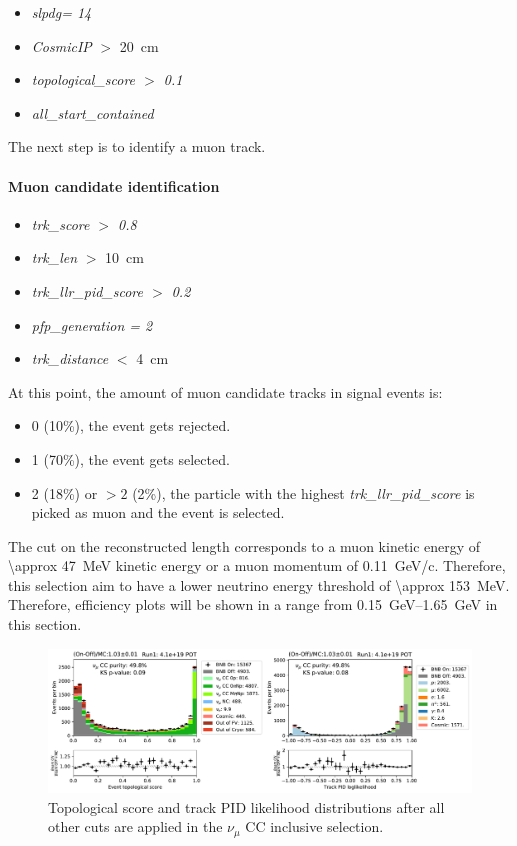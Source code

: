 \begin{itemize}
    \item \textit{slpdg= 14}
    \item \textit{CosmicIP} $>$ \SI{20}{\cm}
    \item \textit{topological\_score $>$ 0.1}
    \item \textit{all\_start\_contained}
\end{itemize} 

The next step is to identify a muon track.
\paragraph{Muon candidate identification} 
\begin{itemize}
    \item \textit{trk\_score $>$ 0.8}
    \item \textit{trk\_len} $>$ \SI{10}{\cm}
    \item \textit{trk\_llr\_pid\_score $>$ 0.2}
    \item \textit{pfp\_generation = 2}
    \item \textit{trk\_distance} $<$ \SI{4}{\cm}
\end{itemize}
At this point, the amount of muon candidate tracks in signal events is:
\begin{itemize}
    \item 0 (10\%), the event gets rejected.
    \item 1 (70\%), the event gets selected.
    \item 2 (18\%) or $>2$ (2\%), the particle with the highest \textit{trk\_llr\_pid\_score} is picked as muon and the event is selected.
\end{itemize}

The cut on the reconstructed length corresponds to a muon kinetic energy of \SI{\approx 47}{\MeV} kinetic energy or a muon momentum of \SI{0.11}{GeV/c}. Therefore, this selection aim to have a lower neutrino energy threshold of \SI{\approx 153}{\MeV}. Therefore, efficiency plots will be shown in a range from \SIrange{0.15}{1.65}{\GeV} in this section.

\begin{figure}
    \centering
    \includegraphics[width=\textwidth]{NuMuCCsel/Images/run1/numu_pret_run1.pdf}
    \caption{Topological score and track PID likelihood distributions after all other cuts are applied in the $\nu_\mu$ CC inclusive selection.}
    \label{fig:numu:topo_pid}
\end{figure}

